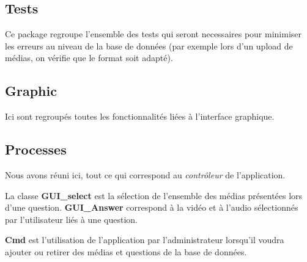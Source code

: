 \documentclass[a4paper,10pt]{report}
\begin{document}
  \subsection{Tests}
  
  Ce package regroupe l'ensemble des tests qui seront necessaires pour minimiser les erreurs au niveau de la base de données (par exemple lors d'un upload de médias, on vérifie que le format soit adapté).
  
  \subsection{Graphic}
  
  Ici sont regroupés toutes les fonctionnalités liées à l'interface graphique.
  
  \subsection{Processes}
  
  Nous avons réuni ici, tout ce qui correspond au \textit{contrôleur} de l'application.
  
  La classe \textbf{GUI\_select} est la sélection de l'ensemble des médias présentées lors d'une question.
  \textbf{GUI\_Answer} correspond à la vidéo et à l'audio sélectionnés par l'utilisateur liés à une question.
  
  \textbf{Cmd} est l'utilisation de l'application par l'administrateur lorsqu'il voudra ajouter ou retirer des médias et questions de la base de données.
  
 

  
\end{document}
